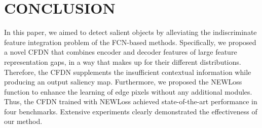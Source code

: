 \documentclass{article}
\begin{document}
\section{CONCLUSION}
\label{sec:conclustion}
\vspace{-0.2cm}
In this paper, we aimed to detect salient objects by alleviating the indiscriminate feature integration problem of the FCN-based methods. Specifically, we proposed a novel CFDN that combines encoder and decoder features of large feature representation gaps, in a way that makes up for their different distributions. Therefore, the CFDN supplements the insufficient contextual information while producing an output saliency map. Furthermore, we proposed the NEWLoss function to enhance the learning of edge pixels without any additional modules. Thus, the CFDN trained with NEWLoss achieved state-of-the-art performance in four benchmarks. Extensive experiments clearly demonstrated the effectiveness of our method.


\newpage
\begingroup
{}


\endgroup
\end{document}
